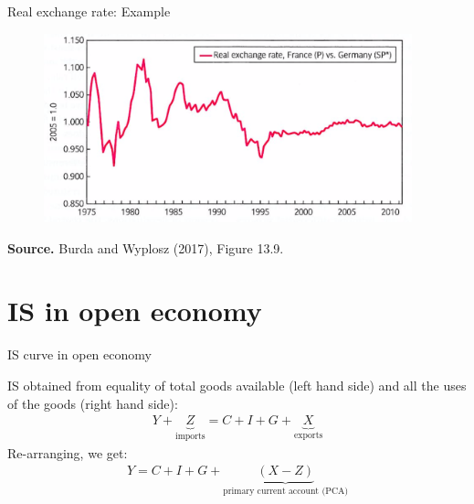 \documentclass{beamer}
\begin{document}
\begin{frame}{Real exchange rate: Example}
  
  \begin{figure}[ht]
	\centering
	\includegraphics[width=0.95\textwidth]{FIGURES/Fig_13_9_RER_France_Germany}
 \end{figure}
 \begin{minipage}{0.6\columnwidth}
\tiny	
\textbf{Source.} Burda and Wyplosz (2017), Figure 13.9.\\
\end{minipage}
\end{frame}


\section{IS in open  economy}
\begin{frame}{IS curve in open economy}

  IS obtained from equality of total goods available (left hand side) and all the uses of the goods (right hand side):
\begin{align*}
  Y + \underbrace{Z}_{\text{imports}}=C+I+G+\underbrace{X}_{\text{exports}} 
\end{align*}
Re-arranging, we get:
\begin{align*}
  Y=C+I+G+\underbrace{(X-Z)}_{\text{primary current account (PCA)}}
\end{align*}
\end{frame}
\end{document}
